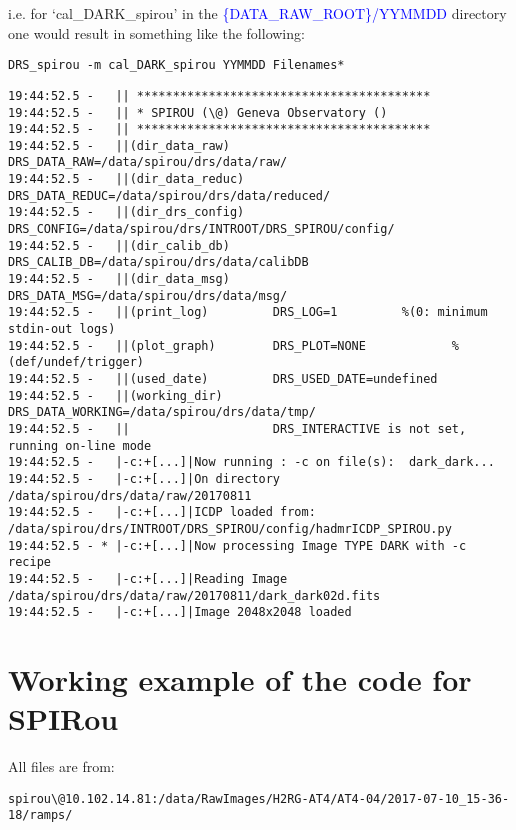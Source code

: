 \noindent i.e. for `cal\_DARK\_spirou' in the \textcolor{blue}{\{DATA\_RAW\_ROOT\}/YYMMDD} directory one would result in something like the following:
\begin{lstlisting}[style=bashstyle]
DRS_spirou -m cal_DARK_spirou YYMMDD Filenames*
\end{lstlisting}
\begin{lstlisting}[style=bashstyle]
19:44:52.5 -   || *****************************************
19:44:52.5 -   || * SPIROU (\@) Geneva Observatory ()
19:44:52.5 -   || *****************************************
19:44:52.5 -   ||(dir_data_raw)      DRS_DATA_RAW=/data/spirou/drs/data/raw/
19:44:52.5 -   ||(dir_data_reduc)    DRS_DATA_REDUC=/data/spirou/drs/data/reduced/
19:44:52.5 -   ||(dir_drs_config)    DRS_CONFIG=/data/spirou/drs/INTROOT/DRS_SPIROU/config/
19:44:52.5 -   ||(dir_calib_db)      DRS_CALIB_DB=/data/spirou/drs/data/calibDB
19:44:52.5 -   ||(dir_data_msg)      DRS_DATA_MSG=/data/spirou/drs/data/msg/
19:44:52.5 -   ||(print_log)         DRS_LOG=1         %(0: minimum stdin-out logs)
19:44:52.5 -   ||(plot_graph)        DRS_PLOT=NONE            %(def/undef/trigger)
19:44:52.5 -   ||(used_date)         DRS_USED_DATE=undefined
19:44:52.5 -   ||(working_dir)       DRS_DATA_WORKING=/data/spirou/drs/data/tmp/
19:44:52.5 -   ||                    DRS_INTERACTIVE is not set, running on-line mode
19:44:52.5 -   |-c:+[...]|Now running : -c on file(s):  dark_dark...
19:44:52.5 -   |-c:+[...]|On directory /data/spirou/drs/data/raw/20170811
19:44:52.5 -   |-c:+[...]|ICDP loaded from: /data/spirou/drs/INTROOT/DRS_SPIROU/config/hadmrICDP_SPIROU.py
19:44:52.5 - * |-c:+[...]|Now processing Image TYPE DARK with -c recipe
19:44:52.5 -   |-c:+[...]|Reading Image /data/spirou/drs/data/raw/20170811/dark_dark02d.fits
19:44:52.5 -   |-c:+[...]|Image 2048x2048 loaded

\end{lstlisting}

\section{Working example of the code for SPIRou}
\label{section:working_example}

All files are from:
\begin{lstlisting}[style=bashstyle]
spirou\@10.102.14.81:/data/RawImages/H2RG-AT4/AT4-04/2017-07-10_15-36-18/ramps/
\end{lstlisting}  


